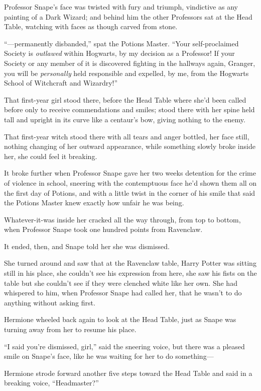 Professor Snape’s face was twisted with fury and triumph, vindictive as any painting of a Dark Wizard; and behind him the other Professors sat at the Head Table, watching with faces as though carved from stone.

“—permanently disbanded,” spat the Potions Master. “Your self-proclaimed Society is \emph{outlawed} within Hogwarts, by my decision as a Professor! If your Society or any member of it is discovered fighting in the hallways again, Granger, you will be \emph{personally} held responsible and expelled, by me, from the Hogwarts School of Witchcraft and Wizardry!”

That first-year girl stood there, before the Head Table where she’d been called before only to receive commendations and smiles; stood there with her spine held tall and upright in its curve like a centaur’s bow, giving nothing to the enemy.

That first-year witch stood there with all tears and anger bottled, her face still, nothing changing of her outward appearance, while something slowly broke inside her, she could feel it breaking.

It broke further when Professor Snape gave her two weeks detention for the crime of violence in school, sneering with the contemptuous face he’d shown them all on the first day of Potions, and with a little twist in the corner of his smile that said the Potions Master knew exactly how unfair he was being.

Whatever-it-was inside her cracked all the way through, from top to bottom, when Professor Snape took one hundred points from Ravenclaw.

It ended, then, and Snape told her she was dismissed.

She turned around and saw that at the Ravenclaw table, Harry Potter was sitting still in his place, she couldn’t see his expression from here, she saw his fists on the table but she couldn’t see if they were clenched white like her own. She had whispered to him, when Professor Snape had called her, that he wasn’t to do anything without asking first.

Hermione wheeled back again to look at the Head Table, just as Snape was turning away from her to resume his place.

“I said you’re dismissed, girl,” said the sneering voice, but there was a pleased smile on Snape’s face, like he was waiting for her to do something—

Hermione strode forward another five steps toward the Head Table and said in a breaking voice, “Headmaster?”

